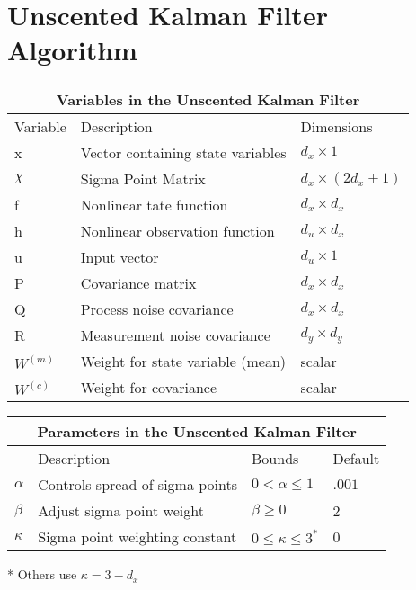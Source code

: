 \section{Unscented Kalman Filter Algorithm}
\begin{center}
    
\centering
\begin{tabular}{ |p{2cm}||p{5cm}|p{2cm}| }
    \hline
    \multicolumn{3}{|c|}{Variables in the Unscented Kalman Filter } \\ 
    \hline
    Variable & Description & Dimensions \\
    \hline
    x & Vector containing state variables & $d_x \times 1 $\\ 
    $\chi $& Sigma Point Matrix &$ d_x \times (2 d_x + 1) $\\
    f & Nonlinear tate function & $d_x \times d_x $  \\ 
    h & Nonlinear observation function & $d_u \times d_x$\\
    u & Input vector  & $d_u \times 1$\\
    P & Covariance matrix & $d_x \times d_x $  \\
    Q & Process noise covariance & $d_x \times d_x $  \\
    R & Measurement noise covariance & $d_y \times d_y $  \\
     $W^{(m)}$ & Weight for state variable (mean) & scalar \\
    $W^{(c)}$ & Weight for covariance & scalar \\
    \hline
\end{tabular} 
\end{center}
\begin{center}
\begin{tabular}{ |p{1cm}||p{5cm}|p{2cm}| p{1cm}| }
    \hline
    \multicolumn{4}{|c|}{Parameters in the Unscented Kalman Filter } \\ 
    \hline
     & Description & Bounds & Default \\
    \hline
    $\alpha$ & Controls spread of sigma points & $0 < \alpha \leq 1$ & $.001$\\
    $\beta$ & Adjust sigma point weight & $\beta \geq 0$ & 2\\
    $\kappa $ & Sigma point weighting constant & $0 \leq \kappa \leq 3^{*}$  & 0 \\
    \hline
\end{tabular}
\end{center}
* Others use $\kappa  = 3 - d_x$ 

